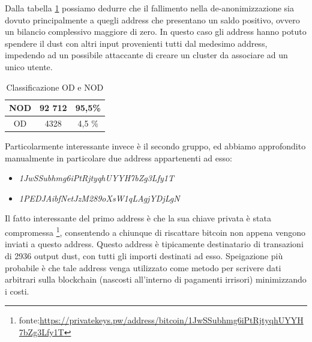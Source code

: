Dalla tabella \ref{tab:OD_NOD_failed} possiamo dedurre che il fallimento nella de-anonimizzazione sia dovuto principalmente a quegli address che presentano un saldo positivo, ovvero un bilancio complessivo maggiore di zero. In questo caso gli address hanno potuto spendere il dust con altri input provenienti tutti dal medesimo address, impedendo ad un possibile attaccante di creare un cluster da associare ad un unico utente.
\begin{table}[H]
    \centering
    \begin{tabular}{|c|c|c|}
        \hline
            NOD  & 92 712 & 95,5\%\\
        \hline 
            OD  & 4328 & 4,5 \%\\
        \hline
    \end{tabular}
    \caption{Classificazione OD e NOD}
    \label{tab:OD_NOD_failed}
\end{table}
Particolarmente interessante invece è il secondo gruppo, ed abbiamo approfondito manualmente in particolare due address appartenenti ad esso:
\begin{itemize}
    \item \textit{1JwSSubhmg6iPtRjtyqhUYYH7bZg3Lfy1T}
    \item \textit{1PEDJAibfNetJzM289oXsW1qLAgjYDjLgN}
\end{itemize}

Il fatto interessante del primo address è che la sua chiave privata è stata compromessa \footnote{fonte:\url{https://privatekeys.pw/address/bitcoin/1JwSSubhmg6iPtRjtyqhUYYH7bZg3Lfy1T}}, consentendo a chiunque di riscattare bitcoin non appena vengono inviati a questo address. Questo address è tipicamente destinatario di transazioni di 2936 output dust, con tutti gli importi destinati ad esso. Speigazione più probabile è che tale address venga utilizzato come metodo per scrivere dati arbitrari sulla blockchain (nascosti all'interno di pagamenti irrisori) minimizzando i costi.

